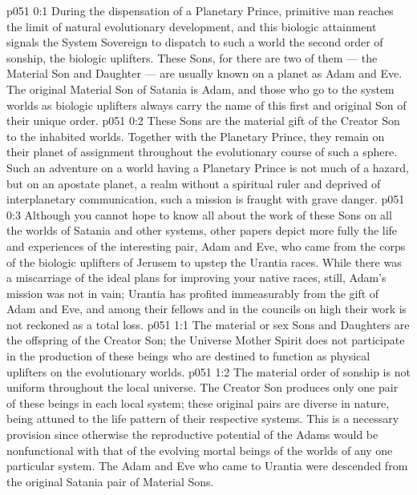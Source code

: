 \author{Secondary Lanonandek}
\vs p051 0:1 During the dispensation of a Planetary Prince, primitive man reaches the limit of natural evolutionary development, and this biologic attainment signals the System Sovereign to dispatch to such a world the second order of sonship, the biologic uplifters. These Sons, for there are two of them --- the Material Son and Daughter --- are usually known on a planet as Adam and Eve. The original Material Son of Satania is Adam, and those who go to the system worlds as biologic uplifters always carry the name of this first and original Son of their unique order.
\vs p051 0:2 These Sons are the material gift of the Creator Son to the inhabited worlds. Together with the Planetary Prince, they remain on their planet of assignment throughout the evolutionary course of such a sphere. Such an adventure on a world having a Planetary Prince is not much of a hazard, but on an apostate planet, a realm without a spiritual ruler and deprived of interplanetary communication, such a mission is fraught with grave danger.
\vs p051 0:3 Although you cannot hope to know all about the work of these Sons on all the worlds of Satania and other systems, other papers depict more fully the life and experiences of the interesting pair, Adam and Eve, who came from the corps of the biologic uplifters of Jerusem to upstep the Urantia races. While there was a miscarriage of the ideal plans for improving your native races, still, Adam’s mission was not in vain; Urantia has profited immeasurably from the gift of Adam and Eve, and among their fellows and in the councils on high their work is not reckoned as a total loss.
\vs p051 1:1 The material or sex Sons and Daughters are the offspring of the Creator Son; the Universe Mother Spirit does not participate in the production of these beings who are destined to function as physical uplifters on the evolutionary worlds.
\vs p051 1:2 The material order of sonship is not uniform throughout the local universe. The Creator Son produces only one pair of these beings in each local system; these original pairs are diverse in nature, being attuned to the life pattern of their respective systems. This is a necessary provision since otherwise the reproductive potential of the Adams would be nonfunctional with that of the evolving mortal beings of the worlds of any one particular system. The Adam and Eve who came to Urantia were descended from the original Satania pair of Material Sons.
